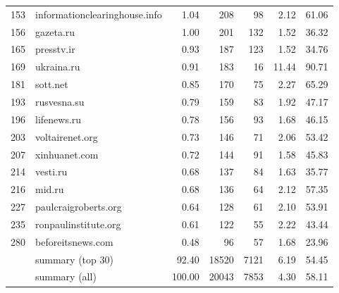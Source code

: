 \begin{tabular}{rlrrrrr}
153              &  informationclearinghouse.info &    1.04 &    208 &     98 &         2.12 &        61.06 \\
156              &                      gazeta.ru &    1.00 &    201 &    132 &         1.52 &        36.32 \\
165              &                     presstv.ir &    0.93 &    187 &    123 &         1.52 &        34.76 \\
169              &                     ukraina.ru &    0.91 &    183 &     16 &        11.44 &        90.71 \\
181              &                       sott.net &    0.85 &    170 &     75 &         2.27 &        65.29 \\
193              &                    rusvesna.su &    0.79 &    159 &     83 &         1.92 &        47.17 \\
196              &                    lifenews.ru &    0.78 &    156 &     93 &         1.68 &        46.15 \\
203              &                voltairenet.org &    0.73 &    146 &     71 &         2.06 &        53.42 \\
207              &                  xinhuanet.com &    0.72 &    144 &     91 &         1.58 &        45.83 \\
214              &                       vesti.ru &    0.68 &    137 &     84 &         1.63 &        35.77 \\
216              &                         mid.ru &    0.68 &    136 &     64 &         2.12 &        57.35 \\
227              &           paulcraigroberts.org &    0.64 &    128 &     61 &         2.10 &        53.91 \\
235              &           ronpaulinstitute.org &    0.61 &    122 &     55 &         2.22 &        43.44 \\
280              &              beforeitsnews.com &    0.48 &     96 &     57 &         1.68 &        23.96 \\
& summary (top 30) &   92.40 &  18520 &   7121 &         6.19 &        54.45 \\
& summary (all)    &  100.00 &  20043 &   7853 &         4.30 &        58.11 \\
\bottomrule
\end{tabular}
